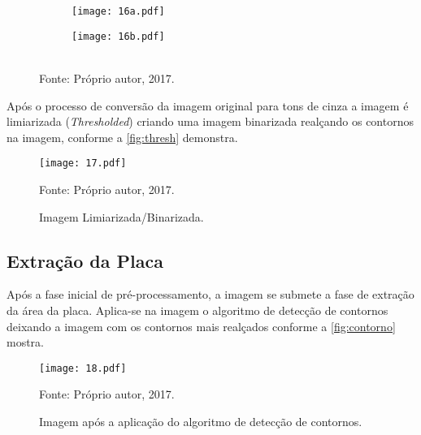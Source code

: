 \begin{figure}[htb]
	\centering
	\caption[\footnotesize Conversão da imagem original para tons de cinza.]{\footnotesize Conversão da imagem original para tons de cinza. a) Imagem original; e b) Imagem em tons de cinza.}   %
	\label{fig:tonscinza}
	\begin{subfigure}{.4\textwidth}
		\centering
		\texttt{[image: 16a.pdf]}
		\caption{ }
	\end{subfigure}
	\begin{subfigure}{.4\textwidth}
		\centering
		\texttt{[image: 16b.pdf]}
		\caption{ }
	\end{subfigure}
	\\
	{\footnotesize Fonte: Próprio autor, 2017.}
\end{figure}

Após o processo de conversão da imagem original para tons de cinza a imagem é limiarizada (\textit{Thresholded}) criando uma imagem binarizada realçando os contornos na imagem, conforme a \autoref{fig:thresh} demonstra.

\begin{figure}[htb]
	\centering
	\caption{{\footnotesize Imagem Limiarizada/Binarizada.}}   %
	\label{fig:thresh}
	\texttt{[image: 17.pdf]}
	
	{\footnotesize Fonte: Próprio autor, 2017.}
\end{figure}

\subsection{\textbf{Extração da Placa}}

Após a fase inicial de pré-processamento, a imagem se submete a fase de extração da área da placa. Aplica-se na imagem o algoritmo de detecção de contornos deixando a imagem com os contornos mais realçados conforme a \autoref{fig:contorno} mostra.

\begin{figure}[htb]
	\centering
	\caption{{\footnotesize Imagem após a aplicação do algoritmo de detecção de contornos.}}   %
	\label{fig:contorno}
	\texttt{[image: 18.pdf]}
	
	{\footnotesize Fonte: Próprio autor, 2017.}
\end{figure}

